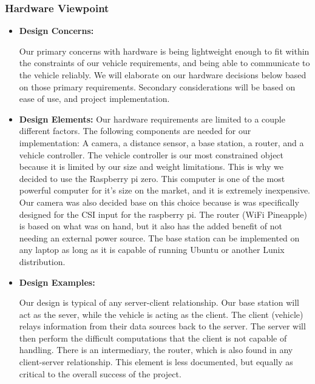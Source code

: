 \documentclass[onecolumn, draftclsnofoot,10pt, compsoc]{IEEEtran}
\begin{document}
\subsubsection{Hardware Viewpoint} 
\begin{itemize}
\item{ \textbf{Design Concerns:}}

Our primary concerns with hardware is being lightweight enough to fit within the constraints of our vehicle requirements, and being able to communicate to the vehicle reliably. We will elaborate on our hardware decisions below based on those primary requirements. Secondary considerations will be based on ease of use, and project implementation. 

\item{ \textbf{Design Elements:}}
Our hardware requirements are limited to a couple different factors. The following components are needed for our implementation: A camera, a distance sensor, a base station, a router, and a vehicle controller. The vehicle controller is our most constrained object because it is limited by our size and weight limitations. This is why we decided to use the Raspberry pi zero. This computer is one of the most powerful computer for it's size on the market, and it is extremely inexpensive. Our camera was also decided base on this choice because is was specifically designed for the CSI input for the raspberry pi. The router (WiFi Pineapple) is based on what was on hand, but it also has the added benefit of not needing an external power source. The base station can be implemented on any laptop as long as it is capable of running Ubuntu or another Lunix distribution.  

\item{ \textbf{Design Examples:}} %

Our design is typical of any server-client relationship. Our base station will act as the sever, while the vehicle is acting as the client. The client (vehicle) relays information from their data sources back to the server. The server will then perform the difficult computations that the client is not capable of handling. There is an intermediary, the router, which is also found in any client-server relationship. This element is less documented, but equally as critical to the overall success of the project.
\end{itemize}
\end{document}
